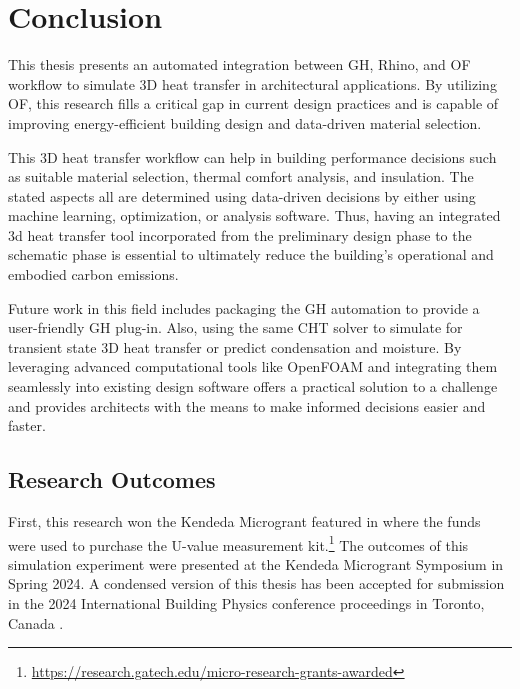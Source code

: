 \chapter{Conclusion}
This thesis presents an automated integration between GH, Rhino, and OF workflow to simulate 3D heat transfer in architectural applications. 
By utilizing OF, this research fills a critical gap in current design practices and is capable of improving energy-efficient building design and data-driven material selection. 

This 3D heat transfer workflow can help in building performance decisions such as suitable material selection, thermal comfort analysis, and insulation.
The stated aspects all are determined using data-driven decisions by either using machine learning, optimization, or analysis software. Thus, having an integrated 3d heat transfer tool incorporated from the preliminary design phase to the schematic phase is essential to ultimately reduce the building's operational and embodied carbon emissions. 

Future work in this field includes packaging the GH automation to provide a user-friendly GH plug-in. Also, using the same CHT solver to simulate for transient state 3D heat transfer or predict condensation and moisture. By leveraging advanced computational tools like OpenFOAM and integrating them seamlessly into existing design software offers a practical solution to a challenge and provides architects with the means to make informed decisions easier and faster. 

\section{Research Outcomes}
First, this research won the Kendeda Microgrant featured in \cite{kendeda} where the funds were used to purchase the U-value measurement kit.\footnote{\url{https://research.gatech.edu/micro-research-grants-awarded}}
The outcomes of this simulation experiment were presented at the Kendeda Microgrant Symposium in Spring 2024. 
A condensed version of this thesis has been accepted for submission in the 2024 International Building Physics conference proceedings in Toronto, Canada \cite{ibpc}. 



